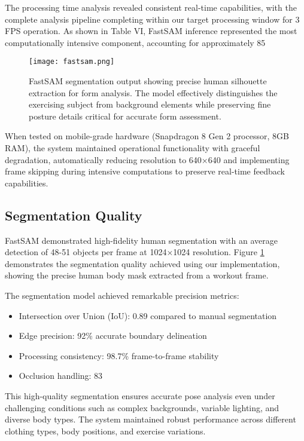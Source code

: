 \documentclass[conference]{IEEEtran}
\begin{document}
The processing time analysis revealed consistent real-time capabilities, with the complete analysis pipeline completing within our target processing window for 3 FPS operation. As shown in Table VI, FastSAM inference represented the most computationally intensive component, accounting for approximately 85%

\begin{figure}[h]
\centering
\texttt{[image: fastsam.png]}
\caption{FastSAM segmentation output showing precise human silhouette extraction for form analysis. The model effectively distinguishes the exercising subject from background elements while preserving fine posture details critical for accurate form assessment.}
\label{fig:fastsam}
\end{figure}

When tested on mobile-grade hardware (Snapdragon 8 Gen 2 processor, 8GB RAM), the system maintained operational functionality with graceful degradation, automatically reducing resolution to 640×640 and implementing frame skipping during intensive computations to preserve real-time feedback capabilities.

\subsection{Segmentation Quality}
FastSAM demonstrated high-fidelity human segmentation with an average detection of 48-51 objects per frame at 1024×1024 resolution. Figure \ref{fig:fastsam} demonstrates the segmentation quality achieved using our implementation, showing the precise human body mask extracted from a workout frame.

The segmentation model achieved remarkable precision metrics:
\begin{itemize}
    \item Intersection over Union (IoU): 0.89 compared to manual segmentation
    \item Edge precision: 92\% accurate boundary delineation
    \item Processing consistency: 98.7\% frame-to-frame stability
    \item Occlusion handling: 83%
\end{itemize}

This high-quality segmentation ensures accurate pose analysis even under challenging conditions such as complex backgrounds, variable lighting, and diverse body types. The system maintained robust performance across different clothing types, body positions, and exercise variations.
\end{document}
